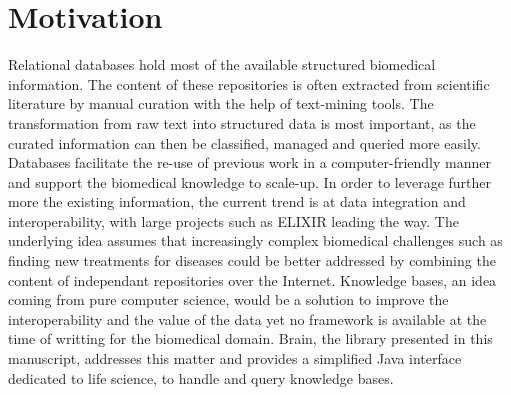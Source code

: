 \documentclass{bioinfo}
\begin{document}
\section{Motivation}
Relational databases hold most of the available structured biomedical information. The content of these repositories is often
extracted from scientific literature by manual curation with the help of text-mining tools. The transformation from raw text into
structured data is most important, as the curated information can then be classified, managed and queried more easily. Databases facilitate
the re-use of previous work in a computer-friendly manner and support the biomedical knowledge to scale-up. In order to leverage further 
more the existing information, the current trend is at data integration and interoperability, with large projects such as ELIXIR leading the way.
The underlying idea assumes that increasingly complex biomedical challenges such as finding new treatments for diseases could be better 
addressed by combining the content of independant repositories over the Internet. Knowledge bases, an idea coming from pure computer science, 
would be a solution to improve the interoperability and the value of the data yet no framework is available at the time of writting for 
the biomedical domain. Brain, the library presented in this manuscript, addresses this matter and provides a simplified 
Java interface dedicated to life science, to handle and query knowledge bases.
\end{document}
